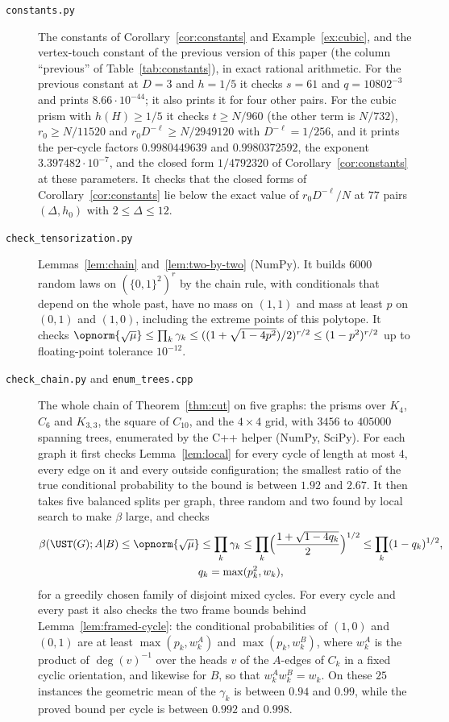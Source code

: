 \begin{description}
\item[\texttt{constants.py}] The constants of Corollary~\ref{cor:constants} and Example~\ref{ex:cubic}, and the vertex-touch constant of the previous version of this paper (the column ``previous'' of Table~\ref{tab:constants}), in exact rational arithmetic. For the previous constant at $D=3$ and $h=1/5$ it checks $s=61$ and $q=10802^{-3}$ and prints $8.66\cdot10^{-44}$; it also prints it for four other pairs. For the cubic prism with $h(H)\ge1/5$ it checks $t\ge N/960$ (the other term is $N/732$), $r_0\ge N/11520$ and $r_0D^{-\ell}\ge N/2949120$ with $D^{-\ell}=1/256$, and it prints the per-cycle factors $0.9980449639$ and $0.9980372592$, the exponent $3.397482\cdot10^{-7}$, and the closed form $1/4792320$ of Corollary~\ref{cor:constants} at these parameters. It checks that the closed forms of Corollary~\ref{cor:constants} lie below the exact value of $r_0D^{-\ell}/N$ at $77$ pairs $(\Delta,h_0)$ with $2\le\Delta\le12$.

\item[\texttt{check\_tensorization.py}] Lemmas~\ref{lem:chain} and~\ref{lem:two-by-two} (NumPy). It builds $6000$ random laws on $(\{0,1\}^2)^r$ by the chain rule, with conditionals that depend on the whole past, have no mass on $(1,1)$ and mass at least $p$ on $(0,1)$ and $(1,0)$, including the extreme points of this polytope. It checks $\opnorm{\sqrt\mu}\le\prod_k\gamma_k\le((1+\sqrt{1-4p^2})/2)^{r/2}\le(1-p^2)^{r/2}$ up to floating-point tolerance $10^{-12}$.

\item[\texttt{check\_chain.py} and \texttt{enum\_trees.cpp}] The whole chain of Theorem~\ref{thm:cut} on five graphs: the prisms over $K_4$, $C_6$ and $K_{3,3}$, the square of $C_{10}$, and the $4\times4$ grid, with $3456$ to $405000$ spanning trees, enumerated by the C++ helper (NumPy, SciPy). For each graph it first checks Lemma~\ref{lem:local} for every cycle of length at most $4$, every edge on it and every outside configuration; the smallest ratio of the true conditional probability to the bound is between $1.92$ and $2.67$. It then takes five balanced splits per graph, three random and two found by local search to make $\beta$ large, and checks
\begin{gather*}
  \beta(\UST(G);A|B)\le\opnorm{\sqrt\mu}\le\prod_k\gamma_k\le\prod_k\Bigl(\frac{1+\sqrt{1-4q_k}}2\Bigr)^{1/2}\le\prod_k(1-q_k)^{1/2},\\
  q_k=\max(p_k^2,w_k),
\end{gather*}
for a greedily chosen family of disjoint mixed cycles. For every cycle and every past it also checks the two frame bounds behind Lemma~\ref{lem:framed-cycle}: the conditional probabilities of $(1,0)$ and $(0,1)$ are at least $\max(p_k,w^A_k)$ and $\max(p_k,w^B_k)$, where $w^A_k$ is the product of $\deg(v)^{-1}$ over the heads $v$ of the $A$-edges of $C_k$ in a fixed cyclic orientation, and likewise for $B$, so that $w^A_kw^B_k=w_k$. On these $25$ instances the geometric mean of the $\gamma_k$ is between $0.94$ and $0.99$, while the proved bound per cycle is between $0.992$ and $0.998$.


\end{description}
